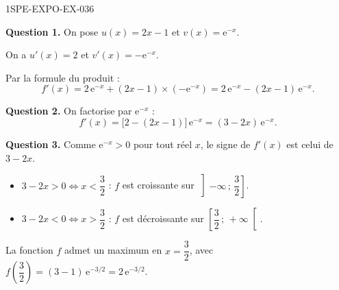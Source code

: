 \begin{corrige}{1SPE-EXPO-EX-036}

\textbf{Question 1.} On pose $u(x) = 2x - 1$ et $v(x) = \mathrm{e}^{-x}$.

On a $u'(x) = 2$ et $v'(x) = -\mathrm{e}^{-x}$.

Par la formule du produit :
\[f'(x) = 2\,\mathrm{e}^{-x} + (2x-1) \times (-\mathrm{e}^{-x}) = 2\,\mathrm{e}^{-x} - (2x-1)\,\mathrm{e}^{-x}.\]

\textbf{Question 2.} On factorise par $\mathrm{e}^{-x}$ :
\[f'(x) = \bigl[2 - (2x-1)\bigr]\,\mathrm{e}^{-x} = \boxed{(3-2x)\,\mathrm{e}^{-x}}.\]

\textbf{Question 3.} Comme $\mathrm{e}^{-x} > 0$ pour tout réel $x$, le signe de $f'(x)$ est celui de $3 - 2x$.
\begin{itemize}
\item $3 - 2x > 0 \iff x < \dfrac{3}{2}$ : $f$ est croissante sur $\left]-\infty\,;\,\dfrac{3}{2}\right]$.
\item $3 - 2x < 0 \iff x > \dfrac{3}{2}$ : $f$ est décroissante sur $\left[\dfrac{3}{2}\,;\,+\infty\right[$.
\end{itemize}
La fonction $f$ admet un maximum en $x = \dfrac{3}{2}$, avec $f\!\left(\dfrac{3}{2}\right) = (3-1)\,\mathrm{e}^{-3/2} = 2\,\mathrm{e}^{-3/2}$.
\end{corrige}
